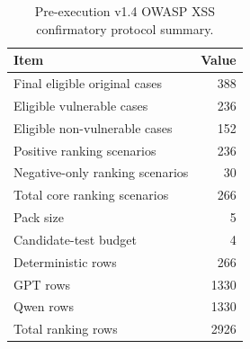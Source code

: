 \begin{table}[ht]
\centering
\caption{Pre-execution v1.4 OWASP XSS confirmatory protocol summary.}
\label{tab:v14-owasp-xss-protocol-summary}
\begin{tabular}{lr}
\hline
Item & Value \\
\hline
Final eligible original cases & 388 \\
Eligible vulnerable cases & 236 \\
Eligible non-vulnerable cases & 152 \\
Positive ranking scenarios & 236 \\
Negative-only ranking scenarios & 30 \\
Total core ranking scenarios & 266 \\
Pack size & 5 \\
Candidate-test budget & 4 \\
Deterministic rows & 266 \\
GPT rows & 1330 \\
Qwen rows & 1330 \\
Total ranking rows & 2926 \\
\hline
\end{tabular}
\end{table}
